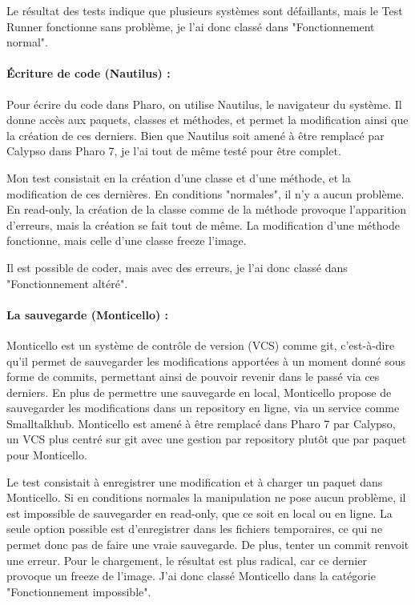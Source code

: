 Le résultat des tests indique que plusieurs systèmes sont défaillants, mais le Test Runner fonctionne sans problème, je l'ai donc classé dans "Fonctionnement normal".

\paragraph{Écriture de code (Nautilus) :}
Pour écrire du code dans Pharo, on utilise Nautilus, le navigateur du système. Il donne accès aux paquets, classes et méthodes, et permet la modification ainsi que la création de ces derniers. Bien que Nautilus soit amené à être remplacé par Calypso dans Pharo 7, je l'ai tout de même testé pour être complet.

Mon test consistait en la création d'une classe et d'une méthode, et la modification de ces dernières. En conditions "normales", il n'y a aucun problème. En read-only, la création de la classe comme de la méthode provoque l'apparition d'erreurs, mais la création se fait tout de même. La modification d'une méthode fonctionne, mais celle d'une classe freeze l'image.

Il est possible de coder, mais avec des erreurs, je l'ai donc classé dans "Fonctionnement altéré".

\paragraph{La sauvegarde (Monticello) :}
Monticello est un système de contrôle de version (VCS) comme git, c'est-à-dire qu'il permet de sauvegarder les modifications apportées à un moment donné sous forme de commits, permettant ainsi de pouvoir revenir dans le passé via ces derniers. En plus de permettre une sauvegarde en local, Monticello propose de sauvegarder les modifications dans un repository en ligne, via un service comme Smalltalkhub. Monticello est amené à être remplacé dans Pharo 7 par Calypso, un VCS plus centré sur git avec une gestion par repository plutôt que par paquet pour Monticello.

Le test consistait à enregistrer une modification et à charger un paquet dans Monticello. Si en conditions normales la manipulation ne pose aucun problème, il est impossible de sauvegarder en read-only, que ce soit en local ou en ligne. La seule option possible est d'enregistrer dans les fichiers temporaires, ce qui ne permet donc pas de faire une vraie sauvegarde. De plus, tenter un commit renvoit une erreur. Pour le chargement, le résultat est plus radical, car ce dernier provoque un freeze de l'image. J'ai donc classé Monticello dans la catégorie "Fonctionnement impossible".

